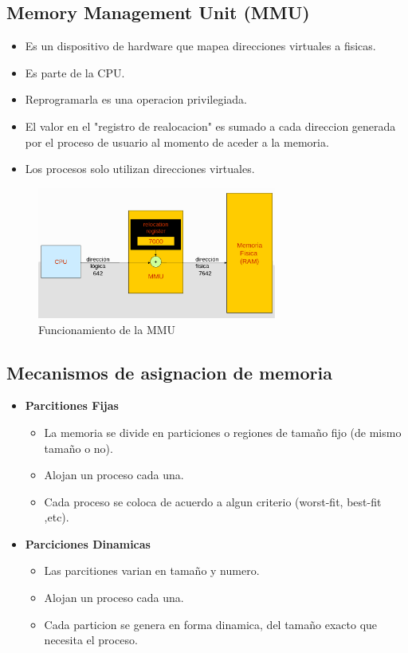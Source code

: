 \subsection{Memory Management Unit (MMU)}
\begin{itemize}
    \item Es un dispositivo de hardware que mapea direcciones virtuales a fisicas.
    \item Es parte de la CPU.
    \item Reprogramarla es una operacion privilegiada.
    \item El valor en el "registro de realocacion" es sumado a cada direccion generada por el proceso de usuario al momento de aceder a la memoria.
    \item Los procesos solo utilizan direcciones virtuales.
\end{itemize}
\begin{figure}[h]
    \begin{center}
        \includegraphics[width=0.70\textwidth]{assets/MMU.pdf}
    \end{center}
    \caption{Funcionamiento de la MMU}\label{fig:}
\end{figure}

\subsection{Mecanismos de asignacion de memoria}
\begin{itemize}
    \item \textbf{Parcitiones Fijas}
    \begin{itemize}
        \item La memoria se divide en particiones o regiones de tamaño fijo (de mismo tamaño o no).
        \item Alojan un proceso cada una.
        \item Cada proceso se coloca de acuerdo a algun criterio (worst-fit, best-fit ,etc).
    \end{itemize}
    \item \textbf{Parciciones Dinamicas}
    \begin{itemize}
        \item Las parcitiones varian en tamaño y numero.
        \item Alojan un proceso cada una.
        \item Cada particion se genera en forma dinamica, del tamaño exacto que necesita el proceso.
    \end{itemize}
\end{itemize}

